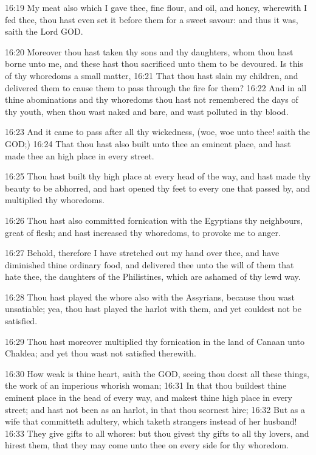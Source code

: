 16:19 My meat also which I gave thee, fine flour, and oil, and honey,
wherewith I fed thee, thou hast even set it before them for a sweet
savour: and thus it was, saith the Lord GOD.

16:20 Moreover thou hast taken thy sons and thy daughters, whom thou
hast borne unto me, and these hast thou sacrificed unto them to be
devoured. Is this of thy whoredoms a small matter, 16:21 That thou
hast slain my children, and delivered them to cause them to pass
through the fire for them?  16:22 And in all thine abominations and
thy whoredoms thou hast not remembered the days of thy youth, when
thou wast naked and bare, and wast polluted in thy blood.

16:23 And it came to pass after all thy wickedness, (woe, woe unto
thee!  saith the \LORD GOD;) 16:24 That thou hast also built unto thee
an eminent place, and hast made thee an high place in every street.

16:25 Thou hast built thy high place at every head of the way, and
hast made thy beauty to be abhorred, and hast opened thy feet to every
one that passed by, and multiplied thy whoredoms.

16:26 Thou hast also committed fornication with the Egyptians thy
neighbours, great of flesh; and hast increased thy whoredoms, to
provoke me to anger.

16:27 Behold, therefore I have stretched out my hand over thee, and
have diminished thine ordinary food, and delivered thee unto the will
of them that hate thee, the daughters of the Philistines, which are
ashamed of thy lewd way.

16:28 Thou hast played the whore also with the Assyrians, because thou
wast unsatiable; yea, thou hast played the harlot with them, and yet
couldest not be satisfied.

16:29 Thou hast moreover multiplied thy fornication in the land of
Canaan unto Chaldea; and yet thou wast not satisfied therewith.

16:30 How weak is thine heart, saith the \LORD GOD, seeing thou doest
all these things, the work of an imperious whorish woman; 16:31 In
that thou buildest thine eminent place in the head of every way, and
makest thine high place in every street; and hast not been as an
harlot, in that thou scornest hire; 16:32 But as a wife that
committeth adultery, which taketh strangers instead of her husband!
16:33 They give gifts to all whores: but thou givest thy gifts to all
thy lovers, and hirest them, that they may come unto thee on every
side for thy whoredom.

